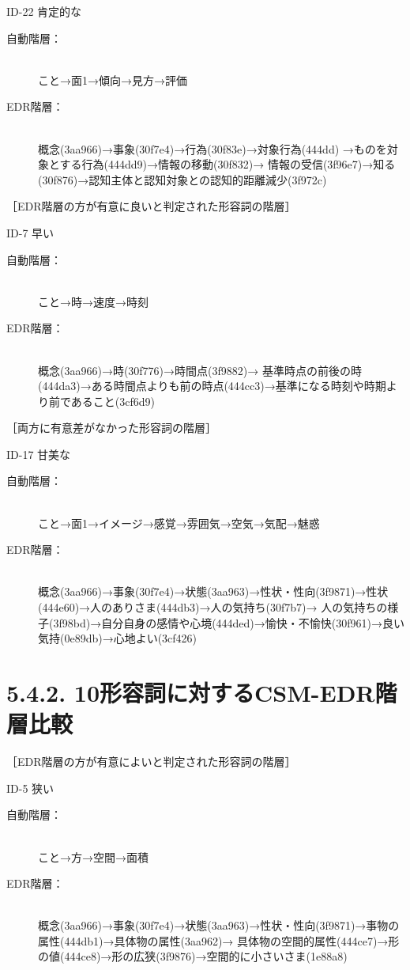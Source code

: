 \documentclass[japanese]{jnlp_1.4}
\begin{document}
\noindent
ID-22 肯定的な
\begin{description}
\item[自動階層：]\mbox{}\\
こと→面1→傾向→見方→評価
\item[EDR階層：]\mbox{}\\
概念(3aa966)→事象(30f7e4)→行為(30f83e)→対象行為(444dd) →ものを対象とする行為(444dd9)→情報の移動(30f832)→
情報の受信(3f96e7)→知る(30f876)→認知主体と認知対象との認知的距離減少(3f972c)
\end{description}

\noindent
［EDR階層の方が有意に良いと判定された形容詞の階層］

\noindent
ID-7 早い
\begin{description}
\item[自動階層：]\mbox{}\\
こと→時→速度→時刻
\item[EDR階層：]\mbox{}\\
概念(3aa966)→時(30f776)→時間点(3f9882)→
基準時点の前後の時(444da3)→ある時間点よりも前の時点(444cc3)→基準になる時刻や時期より前であること(3cf6d9)
\end{description}

\noindent
［両方に有意差がなかった形容詞の階層］

\noindent
ID-17 甘美な
\begin{description}
\item[自動階層：]\mbox{}\\
こと→面1→イメージ→感覚→雰囲気→空気→気配→魅惑
\item[EDR階層：]\mbox{}\\
概念(3aa966)→事象(30f7e4)→状態(3aa963)→性状・性向(3f9871)→性状(444e60)→人のありさま(444db3)→人の気持ち(30f7b7)→
人の気持ちの様子(3f98bd)→自分自身の感情や心境(444ded)→愉快・不愉快(30f961)→良い気持(0e89db)→心地よい(3cf426)
\end{description}



\section{5.4.2. 10形容詞に対するCSM-EDR階層比較}

\noindent
［EDR階層の方が有意によいと判定された形容詞の階層］

\noindent
ID-5 狭い
\begin{description}
\item[自動階層：]\mbox{}\\
こと→方→空間→面積
\item[EDR階層：]\mbox{}\\
概念(3aa966)→事象(30f7e4)→状態(3aa963)→性状・性向(3f9871)→事物の属性(444db1)→具体物の属性(3aa962)→
具体物の空間的属性(444ce7)→形の値(444ce8)→形の広狭(3f9876)→空間的に小さいさま(1e88a8)
\end{description}
\end{document}
